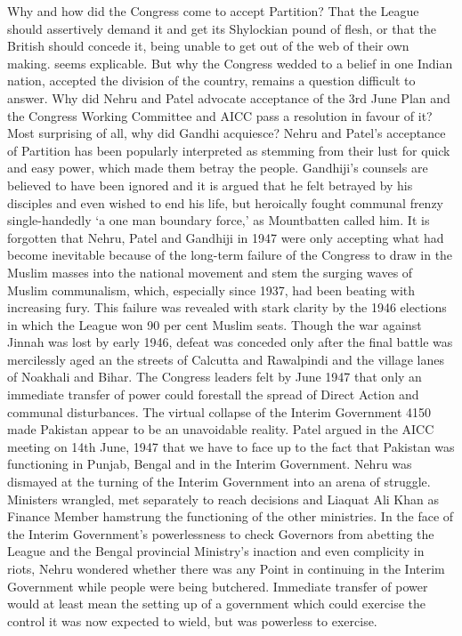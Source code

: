 \begin{multicols}{2}
Why and how did the Congress come to accept Partition? That the League should assertively demand it and get its Shylockian pound of flesh, or that the British should concede it, being unable to get out of the web of their own making. seems explicable. But why the Congress wedded to a belief in one Indian nation, accepted the division of the country, remains a question difficult to answer. Why did Nehru and Patel advocate acceptance of the 3rd June Plan and the Congress Working Committee and AICC pass a resolution in favour of it? Most surprising of all, why did Gandhi acquiesce? Nehru and Patel's acceptance of Partition has been popularly interpreted as stemming from their lust for quick and easy power, which made them betray the people. Gandhiji's counsels are believed to have been ignored and it is argued that he felt betrayed by his disciples and even wished to end his life, but heroically fought communal frenzy single-handedly `a one man boundary force,' as Mountbatten called him. It is forgotten that Nehru, Patel and Gandhiji in 1947 were only accepting what had become inevitable because of the long-term failure of the Congress to draw in the Muslim masses into the national movement and stem the surging waves of Muslim communalism, which, especially since 1937, had been beating with increasing fury. This failure was revealed with stark clarity by the 1946 elections in which the League won 90 per cent Muslim seats. Though the war against Jinnah was lost by early 1946, defeat was conceded only after the final battle was mercilessly aged an the streets of Calcutta and Rawalpindi and the village lanes of Noakhali and Bihar. The Congress leaders felt by June 1947 that only an immediate transfer of power could forestall the spread of Direct Action and communal disturbances. The virtual collapse of the Interim Government 4150 made Pakistan appear to be an unavoidable reality. Patel argued in the AICC meeting on 14th June, 1947 that we have to face up to the fact that Pakistan was functioning in Punjab, Bengal and in the Interim Government. Nehru was dismayed at the turning of the Interim Government into an arena of struggle. Ministers wrangled, met separately to reach decisions and Liaquat Ali Khan as Finance Member hamstrung the functioning of the other ministries. In the face of the Interim Government's powerlessness to check Governors from abetting the League and the Bengal provincial Ministry's inaction and even complicity in riots, Nehru wondered whether there was any Point in continuing in the Interim Government while people were being butchered. Immediate transfer of power would at least mean the setting up of a government which could exercise the control it was now expected to wield, but was powerless to exercise. 


\end{multicols}
